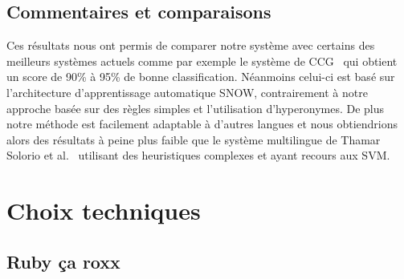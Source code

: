 \documentclass[10pt,a4paper]{article}
\begin{document}
\subsection{Commentaires et comparaisons}
\par Ces résultats nous ont permis de comparer notre système avec certains des meilleurs systèmes actuels
 comme par exemple le système de CCG~\cite{learning:paper} qui obtient un score de 90\% à 95\% de bonne classification. Néanmoins celui-ci est basé sur l'architecture d'apprentissage automatique SNOW, contrairement à notre approche basée sur des règles simples et l'utilisation d'hyperonymes.
De plus notre méthode est facilement adaptable à d'autres langues 
 et nous obtiendrions alors des résultats à peine plus faible que le système multilingue de Thamar Solorio et al.~\cite{solorio:paper} utilisant des heuristiques complexes et ayant recours aux SVM.

\section{Choix techniques}
\subsection{Ruby ça roxx}
\end{document}
